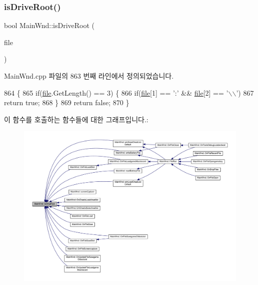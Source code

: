 \subsubsection{\texorpdfstring{is\+Drive\+Root()}{isDriveRoot()}}
{\footnotesize\ttfamily bool Main\+Wnd\+::is\+Drive\+Root (\begin{DoxyParamCaption}\item[{C\+String \&}]{file }\end{DoxyParamCaption})}



Main\+Wnd.\+cpp 파일의 863 번째 라인에서 정의되었습니다.


\begin{DoxyCode}
864 \{
865   \textcolor{keywordflow}{if}(\mbox{\hyperlink{expr-lex_8cpp_a702945180aa732857b380a007a7e2a21}{file}}.GetLength() == 3) \{
866     \textcolor{keywordflow}{if}(\mbox{\hyperlink{expr-lex_8cpp_a702945180aa732857b380a007a7e2a21}{file}}[1] == \textcolor{charliteral}{':'} && \mbox{\hyperlink{expr-lex_8cpp_a702945180aa732857b380a007a7e2a21}{file}}[2] == \textcolor{charliteral}{'\(\backslash\)\(\backslash\)'})
867       \textcolor{keywordflow}{return} \textcolor{keyword}{true};
868   \}
869   \textcolor{keywordflow}{return} \textcolor{keyword}{false};
870 \}
\end{DoxyCode}
이 함수를 호출하는 함수들에 대한 그래프입니다.\+:
\nopagebreak
\begin{figure}[H]
\begin{center}
\leavevmode
\includegraphics[width=350pt]{class_main_wnd_a3ee1d2026d24932c2ca0985c04fc8dd5_icgraph}
\end{center}
\end{figure}
\mbox{\label{class_main_wnd_ae53f005e124fddf8681dc9a31992841f}} 
